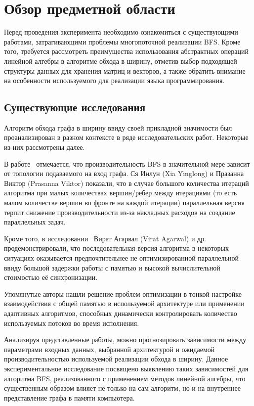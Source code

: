 
\section{Обзор предметной области}
\label{sec:relatedworks}
\noindent Перед проведения эксперимента необходимо ознакомиться с существующими работами, затрагивающими проблемы многопоточной реализации BFS. Кроме того, требуется рассмотреть преимущества использования абстрактных операций линейной алгебры в алгоритме обхода в ширину, отметив выбор подходящей структуры данных для хранения матриц и векторов, а также обратить внимание на особенности используемого для реализации языка программирования.



\subsection{Существующие исследования}
Алгоритм обхода графа в ширину ввиду своей прикладной значимости был проанализирован в разном контексте в ряде исследовательских работ. Некоторые из них рассмотрены далее.

В работе~\cite{adaptiveBFS} отмечается, что производительность BFS в значительной мере зависит от топологии подаваемого на вход графа. Ся Инлун (Xia Yinglong) и Празанна Виктор (Prasanna Viktor) показали, что в случае большого количества итераций алгоритма при малых количествах вершин/ребер между итерациями (то есть малом количестве вершин во фронте на каждой итерации) параллельная версия терпит снижение производительности из-за накладных расходов на создание параллельных задач.

Кроме того, в исследовании~\cite{scalableBFS} Вират Агарвал (Virat Agarwal) и др. продемонстрировали, что последовательная версия алгоритма в некоторых ситуациях оказывается предпочтительнее не оптимизированной параллельной ввиду большой задержки работы с памятью и высокой вычислительной стоимостью её синхронизации. 

Упомянутые авторы нашли решение проблем оптимизации в тонкой настройке взаимодействия с общей памятью в используемой архитектуре или применении адаптивных алгоритмов, способных динамически контролировать количество используемых потоков во время исполнения.

Анализируя представленные работы, можно прогнозировать зависимости между параметрами входных данных, выбранной архитектурой и ожидаемой производительностью используемой реализации обхода в ширину. Данное экспериментальное исследование посвящено выявлению таких зависимостей для алгоритма BFS, реализованного с применением методов линейной алгебры, что существенным образом влияет не только на сам алгоритм, но и на внутреннее представление графа в памяти компьютера.




